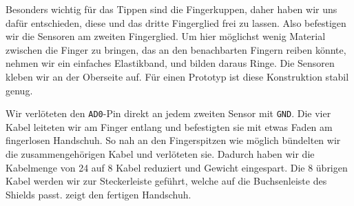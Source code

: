Besonders wichtig für das Tippen sind die Fingerkuppen, daher haben wir uns
dafür entschieden, diese und das dritte Fingerglied frei zu lassen. Also
befestigen wir die Sensoren am zweiten Fingerglied. Um hier möglichst wenig
Material zwischen die Finger zu bringen, das an den benachbarten Fingern reiben
könnte, nehmen wir ein einfaches Elastikband, und bilden daraus Ringe.  Die
Sensoren kleben wir an der Oberseite auf. Für einen Prototyp ist diese
Konstruktion stabil genug.


Wir verlöteten den \texttt{AD0}-Pin direkt an jedem zweiten Sensor mit
\texttt{GND}. Die vier Kabel leiteten wir am Finger entlang und befestigten sie
mit etwas Faden am fingerlosen Handschuh. So nah an den Fingerspitzen wie
möglich bündelten wir die zusammengehörigen Kabel und verlöteten sie. Dadurch
haben wir die Kabelmenge von 24 auf 8 Kabel reduziert und Gewicht eingespart.
Die 8 übrigen Kabel werden wir zur Steckerleiste geführt, welche auf die
Buchsenleiste des Shields passt.  zeigt den
fertigen Handschuh.

